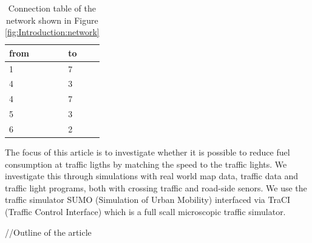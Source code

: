 \begin{table}[h]
\centering
\begin{tabular}{|l|l|}
\hline
from & to \\ \hline
1 & 7 \\ \hline
4 & 3 \\ \hline
4 & 7 \\ \hline
5 & 3 \\ \hline
6 & 2 \\ \hline
\end{tabular}
\caption{Connection table of the network shown in Figure \ref{fig:Introduction:network} }
\label{tab:Introduction:connectionTable}
\end{table}



The focus of this article is to investigate whether it is possible to reduce fuel consumption at traffic ligths by matching the speed to the traffic lights. 
We investigate this through simulations with real world map data, traffic data and traffic light programs, both with crossing traffic and road-side senors. %
We use the traffic simulator SUMO (Simulation of Urban Mobility)\cite{sumo} interfaced via TraCI (Traffic Control Interface)\cite{traci} which is a full scall microscopic traffic simulator.

//Outline of the article





